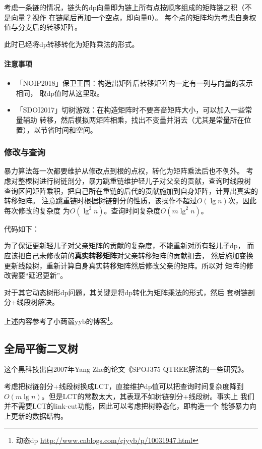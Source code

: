 考虑一条链的情况，链头的dp向量即为链上所有点按顺序组成的矩阵链之积（不是向量？视作
在链尾后再加一个空点，即向量{\bfseries 0}）。
每个点的矩阵均为考虑自身权值与分支后的转移矩阵。

此时已经将dp转移转化为矩阵乘法的形式。

\paragraph{注意事项}
\begin{itemize}
    \item 「NOIP2018」保卫王国：构造出矩阵后转移矩阵内一定有一列与向量的表示相同，
    取dp值时从这里取。
    \item 「SDOI2017」切树游戏：在构造矩阵时不要吝啬矩阵大小，可以加入一些常量辅助
    转移，然后模拟两矩阵相乘，找出不变量并消去（尤其是常量所在位置），以节省时间和空间。
\end{itemize}

\subsubsection{修改与查询}
暴力算法每一次都要维护从修改点到根的点权，转化为矩阵乘法后也不例外。
考虑对整棵树进行树链剖分，暴力跳重链维护轻儿子对父亲的贡献，查询时线段树
查询区间矩阵乘积，把自己所在重链的后代的贡献施加到自身矩阵，计算出真实的转移矩阵。
注意跳重链时根据树链剖分的性质，该操作不超过$O(\lg n)$次，因此每次修改的复杂度
为$O(\lg^2 n)$。查询时间复杂度$O(m\lg^2n)$。

代码如下：


为了保证更新轻儿子对父亲矩阵的贡献的复杂度，不能重新对所有轻儿子dp，
而应该把自己未修改前的{\bfseries 真实转移矩阵}对父亲转移矩阵的贡献扣去，
然后施加变换更新线段树，重新计算自身真实转移矩阵然后修改父亲的矩阵。所以对
矩阵的修改需要``延迟更新''。

对于其它动态树形dp问题，其关键是将dp转化为矩阵乘法的形式，然后
套树链剖分+线段树解决。

上述内容参考了小蒟蒻yyb的博客\footnote{
    动态dp
    \url{http://www.cnblogs.com/cjyyb/p/10031947.html}
}。
\subsection{全局平衡二叉树}
这个黑科技出自2007年Yang Zhe的论文《SPOJ375 QTREE解法的一些研究》\cite{GBT}。

考虑把树链剖分+线段树换成LCT，直接维护dp值可以把查询时间复杂度降到
$O(m\lg n)$。但是LCT的常数太大，其表现不如树链剖分+线段树。事实上
我们并不需要LCT的link-cut功能，因此可以考虑把树静态化，即构造一个
能够暴力向上更新的数据结构。

